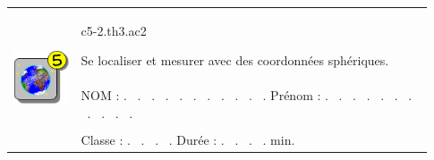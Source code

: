 \documentclass[12pt,a4paper,notitlepage,twoside]{article}
\author{F.G.}
\title{}
\begin{document}
\begin{flushleft}
\begin{tabular}{| m{0.15\linewidth} m{0.78\linewidth} |}
	\hline
	\multirow{4}{*}{\includegraphics[width=\linewidth]{cycle5-logo-terre.png}}	
	& c5-2.th3.ac2
	\begin{LARGE}
	Se localiser et mesurer avec des coordonnées sphériques.
	\end{LARGE} \\ [0.5ex]
	\cline{2-2}
	 & NOM : . \ . \ . \ . \ . \ . \ . \ . \ . \ . \ . Prénom : . \ . \ . \ . \ . \ . \ . \ . \ . \ . \ . \\
	 & \\
	 & Classe : . \ . \ . \ . Durée : . \ . \ . \ . min. \\ [1ex]
	\hline
\end{tabular}



\end{flushleft}
\end{document}
